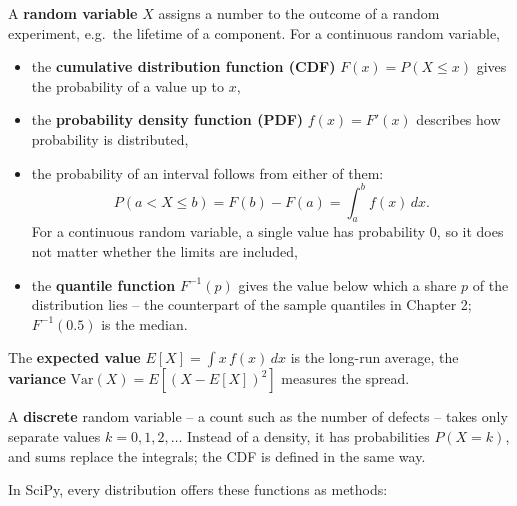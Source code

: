 \documentclass[
  letterpaper,
  DIV=11,
  numbers=noendperiod]{scrreprt}
\providecommand{\tightlist}{%
  \setlength{\itemsep}{0pt}\setlength{\parskip}{0pt}}\usepackage{longtable,booktabs,array}
\begin{document}
\begin{tcolorbox}[enhanced jigsaw, left=2mm, title=\textcolor{quarto-callout-note-color}{\faInfo}\hspace{0.5em}{Definition: Random variable, CDF, PDF and quantile function}, opacityback=0, breakable, rightrule=.15mm, arc=.35mm, toptitle=1mm, colbacktitle=quarto-callout-note-color!10!white, opacitybacktitle=0.6, coltitle=black, colframe=quarto-callout-note-color-frame, bottomrule=.15mm, leftrule=.75mm, bottomtitle=1mm, titlerule=0mm, toprule=.15mm, colback=white]

A \textbf{random variable} \(X\) assigns a number to the outcome of a
random experiment, e.g.~the lifetime of a component. For a continuous
random variable,

\begin{itemize}
\tightlist
\item
  the \textbf{cumulative distribution function (CDF)}
  \(F(x) = P(X \le x)\) gives the probability of a value up to \(x\),
\item
  the \textbf{probability density function (PDF)} \(f(x) = F'(x)\)
  describes how probability is distributed,
\item
  the probability of an interval follows from either of them:
  \[P(a < X \le b) = F(b) - F(a) = \int_a^b f(x)\,dx.\] For a continuous
  random variable, a single value has probability 0, so it does not
  matter whether the limits are included,
\item
  the \textbf{quantile function} \(F^{-1}(p)\) gives the value below
  which a share \(p\) of the distribution lies -- the counterpart of the
  sample quantiles in Chapter 2; \(F^{-1}(0.5)\) is the median.
\end{itemize}

The \textbf{expected value} \(E[X] = \int x\,f(x)\,dx\) is the long-run
average, the \textbf{variance} \(\text{Var}(X) = E[(X - E[X])^2]\)
measures the spread.

A \textbf{discrete} random variable -- a count such as the number of
defects -- takes only separate values \(k = 0, 1, 2, \dots\) Instead of
a density, it has probabilities \(P(X = k)\), and sums replace the
integrals; the CDF is defined in the same way.

\end{tcolorbox}

In SciPy, every distribution offers these functions as methods:
\end{document}
